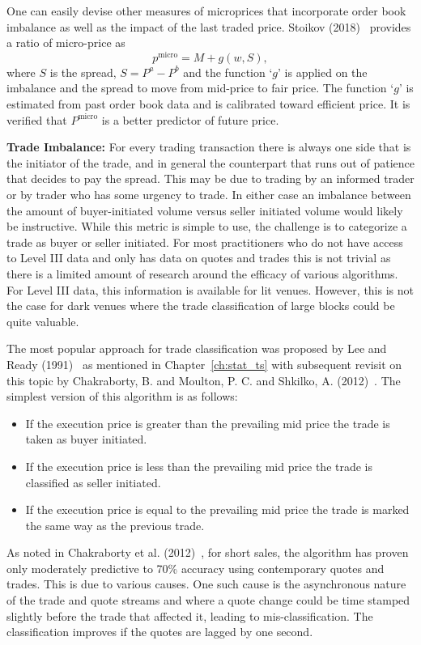 One can easily devise other measures of microprices that incorporate order book imbalance as well as the impact of the last traded price. Stoikov (2018)~\cite{stoikov18} provides a ratio of micro-price as
	\begin{equation} \label{eqn:pmicro}
	p^\text{micro}= M + g(w,S),
	\end{equation}
where $S$ is the spread, $S= P^a - P^b$ and the function `$g$' is applied on the imbalance and the spread to move from mid-price to fair price. The function `$g$' is estimated from past order book data and is calibrated toward efficient price. It is verified that $P^\text{micro}$ is a better predictor of future price. \twomedskip

\noindent\textbf{Trade Imbalance:}
For every trading transaction there is always one side that is the initiator of the trade, and in general the counterpart that runs out of patience that decides to pay the spread. This may be due to trading by an informed trader or by trader who has some urgency to trade. In either case an imbalance between the amount of buyer-initiated volume versus seller initiated volume would likely be instructive. While this metric is simple to use, the challenge is to categorize a trade as buyer or seller initiated. For most practitioners who do not have access to Level III data and only has data on quotes and trades this is not trivial as there is a limited amount of research around the efficacy of various algorithms. For Level III data, this information is available for lit venues. However, this is not the case for dark venues where the trade classification of large blocks could be quite valuable.


The most popular approach for trade classification was proposed by Lee and Ready (1991)~\cite{leeready} as mentioned in Chapter~\ref{ch:stat_ts} with subsequent revisit on this topic by Chakraborty, B. and Moulton, P. C. and Shkilko, A. (2012)~\cite{chakrabarty2012short}. The simplest version of this algorithm is as follows:
        \begin{itemize}
        \item If the execution price is greater than the prevailing mid price the trade is taken as buyer initiated.
        \item If the execution price is less than the prevailing mid price the trade is classified as seller initiated.
        \item If the execution price is equal to the prevailing mid price the trade is marked the same way as the previous trade.
        \end{itemize}
As noted in Chakraborty et al. (2012)~\cite{chakrabarty2012short}, for short sales, the algorithm has proven only moderately predictive to 70\% accuracy using contemporary quotes and trades. This is due to various causes. One such cause is the asynchronous nature of the trade and quote streams and where a quote change could be time stamped slightly before the trade that affected it, leading to mis-classification. The classification improves if the quotes are lagged by one second.



